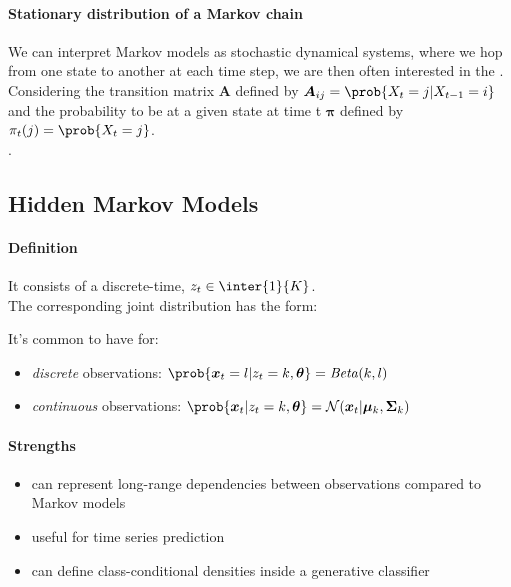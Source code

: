 \paragraph{Stationary distribution of a Markov chain}
We can interpret Markov models as stochastic dynamical systems, where we hop from one state to 
another at each time step, we are then often interested in the .\\
Considering the transition matrix $\bm{A}$ defined by $\bm{A}_{ij}=\prob{X_{t}=j|X_{t-1}=i}$ and 
the probability to be at a given state at time t $\bm{\pi}$ defined by $\pi_{t}(j)=\prob{X_{t}=j}$.\\
.\\



\subsection{Hidden Markov Models}
\paragraph{Definition}
It consists of a discrete-time,  
$z_{t}\in\inter{1}{K}$.\\
The corresponding joint distribution has the form:
\begin{center}
\end{center}

It's common to have for:
\begin{itemize}
    \item \emph{discrete} observations: $\prob{\bm{x}_{t}=l|z_{t}=k,\bm{\theta}} = \text{\emph{Beta}}
        (k,l)$
    \item \emph{continuous} observations: $\prob{\bm{x}_{t}|z_{t}=k,\bm{\theta}} = \mathcal{N}(\bm{x}
        _{t}|\bm{\mu}_{k},\bm{\Sigma}_{k})$
\end{itemize}

\paragraph{Strengths}
\begin{itemize}
    \item can represent long-range dependencies between observations compared to Markov models
    \item useful for time series prediction
    \item can define class-conditional densities inside a generative classifier
\end{itemize}

